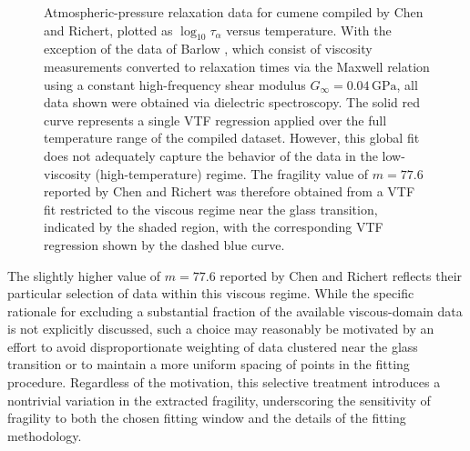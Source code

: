 \begin{figure}
	
	\caption{Atmospheric-pressure relaxation data for cumene compiled by Chen and Richert, plotted as $\log_{10}\tau_{\alpha}$ versus temperature\cite{Chen}. With the exception of the data of Barlow \cite{Barlow}, which consist of viscosity measurements converted to relaxation times via the Maxwell relation using a constant high-frequency shear modulus $G_{\infty}=0.04\,\text{GPa}$, all data shown were obtained via dielectric spectroscopy. The solid red curve represents a single VTF regression applied over the full temperature range of the compiled dataset.  However, this global fit does not adequately capture the behavior of the data in the low-viscosity (high-temperature) regime. The fragility value of $m=77.6$ reported by Chen and Richert was therefore obtained from a VTF fit restricted to the viscous regime near the glass transition, indicated by the shaded region, with the corresponding VTF regression shown by the dashed blue curve.}
	
	\label{fig:Chen_global_VTF}
\end{figure}

The slightly higher value of $m=77.6$ reported by Chen and Richert reflects their particular selection of data within this viscous regime. While the specific rationale for excluding a substantial fraction of the available viscous-domain data is not explicitly discussed, such a choice may reasonably be motivated by an effort to avoid disproportionate weighting of data clustered near the glass transition or to maintain a more uniform spacing of points in the fitting procedure. Regardless of the motivation, this selective treatment introduces a nontrivial variation in the extracted fragility, underscoring the sensitivity of fragility to both the chosen fitting window and the details of the fitting methodology.

